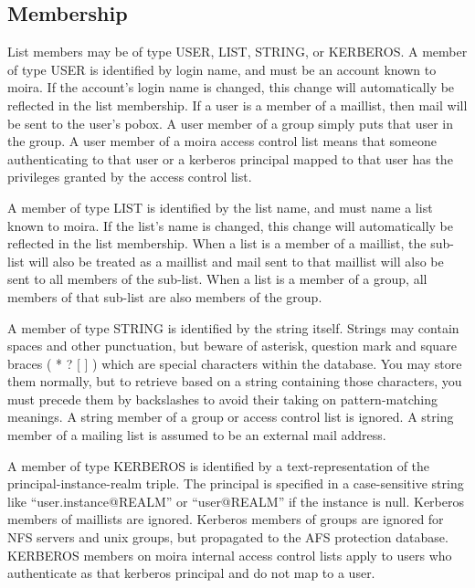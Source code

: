 \subsection{Membership}
\label{listmembership}

 List members may be of type USER, LIST, STRING, or
KERBEROS.  A member of type USER is identified by login name, and must
be an account known to moira.  If the account's login name is changed,
this change will automatically be reflected in the list membership.
If a user is a member of a maillist, then mail will be sent to the
user's pobox.    A user member of a group simply
puts that user in the group.  A user member of a moira access control
list means that someone authenticating to that user or a kerberos
principal mapped to that user has the privileges granted by the access
control list.

A member of type LIST is identified by the list name, and must name a
list known to moira.  If the list's name is changed, this change will
automatically be reflected in the list membership.  
When a list is a member of a maillist, the sub-list will also be
treated as a maillist and mail sent to that maillist will also be sent
to all members of the sub-list.  When a list is a member of a group,
all members of that sub-list are also members of the group.

 A member of type STRING is identified by the string
itself.   Strings may contain spaces and other
punctuation, but beware of asterisk, question mark and square braces (
* ? [ ] ) which are special characters within the database.  You may
store them normally, but to retrieve based on a string containing those
characters, you must precede them by backslashes to avoid their taking
on pattern-matching meanings.  A string member of a group or access
control list is ignored.  A string member of a mailing list is assumed
to be an external mail address.

 A member of type KERBEROS is identified by a
text-representation of the principal-instance-realm triple.  The
principal is specified in a case-sensitive string like
``user.instance@REALM'' or ``user@REALM'' if the instance is null.
Kerberos members of maillists are ignored.   Kerberos
members of groups are ignored for NFS servers and {\sc unix} groups, but
propagated to the AFS protection database.  KERBEROS members on moira
internal access control lists apply to users who authenticate as that
kerberos principal and do not map to a user.

